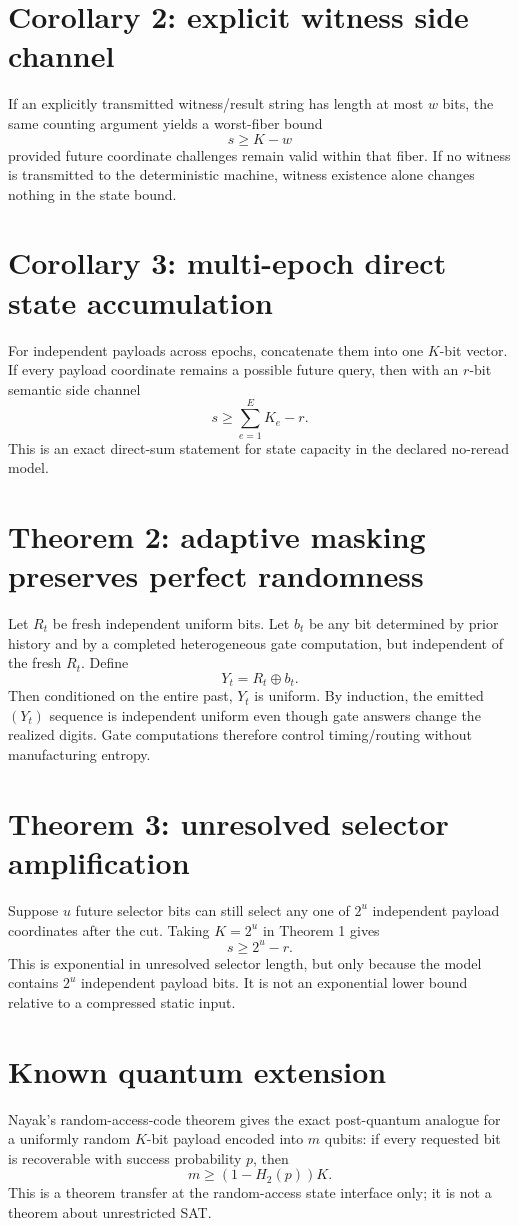 \documentclass[11pt]{article}
\begin{document}
\section*{Corollary 2: explicit witness side channel}
If an explicitly transmitted witness/result string has length at most \(w\) bits, the same counting argument yields a worst-fiber bound
\[
\boxed{s\ge K-w}
\]
provided future coordinate challenges remain valid within that fiber. If no witness is transmitted to the deterministic machine, witness existence alone changes nothing in the state bound.

\section*{Corollary 3: multi-epoch direct state accumulation}
For independent payloads across epochs, concatenate them into one \(K\)-bit vector. If every payload coordinate remains a possible future query, then with an \(r\)-bit semantic side channel
\[
\boxed{s\ge \sum_{e=1}^E K_e-r.}
\]
This is an exact direct-sum statement for state capacity in the declared no-reread model.

\section*{Theorem 2: adaptive masking preserves perfect randomness}
Let \(R_t\) be fresh independent uniform bits. Let \(b_t\) be any bit determined by prior history and by a completed heterogeneous gate computation, but independent of the fresh \(R_t\). Define
\[
Y_t=R_t\oplus b_t.
\]
Then conditioned on the entire past, \(Y_t\) is uniform. By induction, the emitted \((Y_t)\) sequence is independent uniform even though gate answers change the realized digits. Gate computations therefore control timing/routing without manufacturing entropy.

\section*{Theorem 3: unresolved selector amplification}
Suppose \(u\) future selector bits can still select any one of \(2^u\) independent payload coordinates after the cut. Taking \(K=2^u\) in Theorem 1 gives
\[
\boxed{s\ge 2^u-r.}
\]
This is exponential in unresolved selector length, but only because the model contains \(2^u\) independent payload bits. It is not an exponential lower bound relative to a compressed static input.

\section*{Known quantum extension}
Nayak's random-access-code theorem gives the exact post-quantum analogue for a uniformly random \(K\)-bit payload encoded into \(m\) qubits: if every requested bit is recoverable with success probability \(p\), then
\[
\boxed{m\ge (1-H_2(p))K.}
\]
This is a theorem transfer at the random-access state interface only; it is not a theorem about unrestricted SAT.
\end{document}
